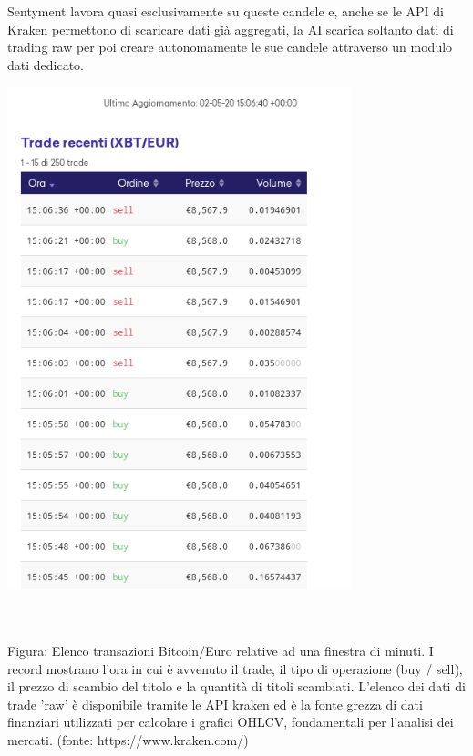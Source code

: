 \documentclass[a4paper,12pt]{report}
\begin{document}
\\~\\

Sentyment lavora quasi esclusivamente su queste candele e, anche se le API di Kraken permettono di scaricare dati già aggregati, la AI scarica soltanto dati di trading raw per poi creare autonomamente le sue candele attraverso un modulo dati dedicato.


\begin{fig}
\begin{center}
		\includegraphics[width=10cm]{kraken_raw}
\end{center}
		\caption{\\~\\Figura: Elenco transazioni Bitcoin/Euro relative ad una finestra di minuti. I record mostrano l'ora in cui è avvenuto il trade, il tipo di operazione (buy / sell), il prezzo di scambio del titolo e la quantità di titoli scambiati. L'elenco dei dati di trade 'raw' è disponibile tramite le API kraken ed è la fonte grezza di dati finanziari utilizzati per calcolare i grafici OHLCV, fondamentali per l'analisi dei mercati. (fonte: https://www.kraken.com/)}
\end{fig}
\end{document}
